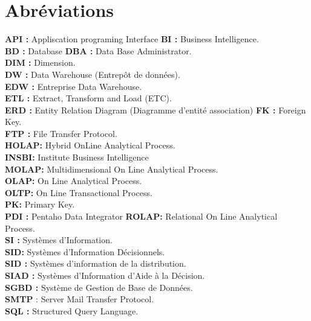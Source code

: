 \chapter{Abréviations}
\textbf{API :} Appliscation programing Interface
\textbf{BI :} Business Intelligence.\\
\textbf{BD :} Database
\textbf{DBA :} Data Base Administrator.\\
\textbf{DIM :} Dimension.\\
\textbf{DW :} Data Warehouse (Entrepôt de données).\\
\textbf{EDW :} Entreprise Data Warehouse.\\
\textbf{ETL :} Extract, Transform and Load (ETC).\\
\textbf{ERD :} Entity Relation Diagram (Diagramme d'entité association)
\textbf{FK :} Foreign Key.\\
\textbf{FTP :} File Transfer Protocol.\\
\textbf{HOLAP:} Hybrid OnLine Analytical Process.\\
\textbf{INSBI:} Institute Business Intelligence\\
\textbf{MOLAP:} Multidimensional On Line Analytical Process.\\
\textbf{OLAP:} On Line Analytical Process.\\
\textbf{OLTP:} On Line Transactional Process.\\
\textbf{PK:} Primary Key.\\
\textbf{PDI :} Pentaho Data Integrator
\textbf{ROLAP:} Relational On Line Analytical Process.\\
\textbf{SI :} Systèmes d’Information.\\
\textbf{SID:} Systèmes d’Information Décisionnels.\\
\textbf{SID :} Systèmes d’information de la distribution.\\
\textbf{SIAD :} Systèmes d’Information d’Aide à la Décision.\\
\textbf{SGBD :} Système de Gestion de Base de Données.\\
\textbf{SMTP }: Server Mail Transfer Protocol.\\
\textbf{SQL :} Structured Query Language.\\
